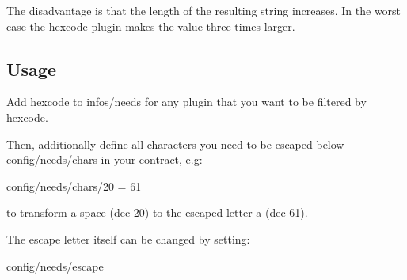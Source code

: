 The disadvantage is that the length of the resulting string increases. In the worst case the hexcode plugin makes the value three times larger.

\subsection*{Usage}

Add {\ttfamily hexcode} to {\ttfamily infos/needs} for any plugin that you want to be filtered by hexcode.

Then, additionally define all characters you need to be escaped below {\ttfamily config/needs/chars} in your contract, e.\+g\+: \begin{DoxyVerb}    config/needs/chars/20 = 61
\end{DoxyVerb}


to transform a space (dec 20) to the escaped letter a (dec 61).

The escape letter itself can be changed by setting\+: \begin{DoxyVerb}    config/needs/escape\end{DoxyVerb}
 